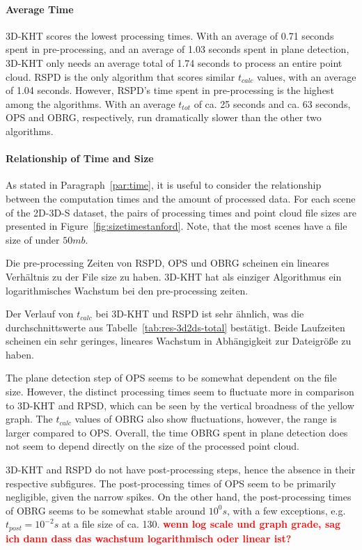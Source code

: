 \documentclass[main.tex]{subfiles}
\begin{document}
\paragraph{Average Time }
\label{par:2D-3D-S-time}
3D-KHT scores the lowest processing times. With an average of 0.71 seconds spent in pre-processing, and an average of 1.03 seconds spent in plane detection,
3D-KHT only needs an average total of 1.74 seconds to process an entire point cloud. RSPD is the only algorithm that scores similar $t_{calc}$ values, with an
average of 1.04 seconds. However, RSPD's time spent in pre-processing is the highest among the algorithms.
With an average $t_{tot}$ of ca. 25 seconds and ca. 63 seconds, OPS and OBRG, respectively, run dramatically slower than the other two algorithms.

\paragraph{Relationship of Time and Size}
As stated in Paragraph~\ref{par:time}, it is useful to consider the relationship between the computation times and the amount of
processed data. For each scene of the 2D-3D-S dataset, the pairs of 
processing times and point cloud file sizes are presented in Figure~\ref{fig:sizetimestanford}. Note, that the most scenes have a 
file size of under $50mb$.


Die pre-processing Zeiten von RSPD, OPS und OBRG scheinen ein lineares Verhältnis zu der File size zu haben. 3D-KHT hat als einziger Algorithmus
ein logarithmisches Wachstum bei den pre-processing zeiten.

Der Verlauf von $t_{calc}$ bei 3D-KHT und RSPD ist sehr ähnlich, was die durchschnittswerte aus Tabelle~\ref{tab:res-3d2ds-total} bestätigt.
Beide Laufzeiten scheinen ein sehr geringes, lineares Wachstum in Abhängigkeit zur Dateigröße zu haben.

The plane detection step of OPS seems to be somewhat dependent on the file size. However, the distinct processing times 
seem to fluctuate more in comparison to 3D-KHT and RPSD, which can be seen by the vertical broadness of the yellow graph.
The $t_{calc}$ values of OBRG also show fluctuations, however, the range is larger compared to OPS. 
Overall, the time OBRG spent in plane detection does not seem to depend directly on the size of the processed point cloud.

3D-KHT and RSPD do not have post-processing steps, hence the absence in their respective subfigures. 
The post-processing times of OPS seem to be primarily negligible, given the narrow spikes. On the other hand, the post-processing times
of OBRG seems to be somewhat stable around $10^0s$, with a few exceptions, e.g. $t_{post}=10^{-2}s$ at a file size of ca. 130.
\textbf{\textcolor{red}{wenn log scale und graph grade, sag ich dann dass das wachstum logarithmisch oder linear ist?}}
\end{document}

